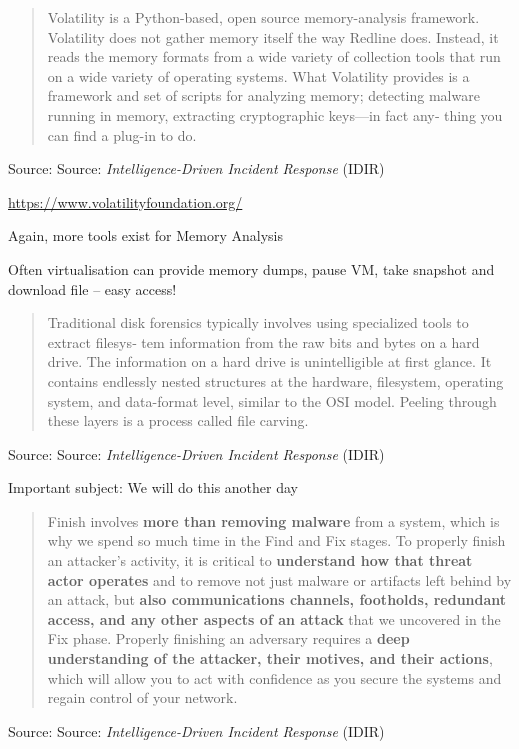 \documentclass[Screen16to9,17pt]{foils}
\begin{document}

\begin{quote}
Volatility is a Python-based, open source memory-analysis framework. Volatility does
not gather memory itself the way Redline does. Instead, it reads the memory formats
from a wide variety of collection tools that run on a wide variety of operating systems.
What Volatility provides is a framework and set of scripts for analyzing memory;
detecting malware running in memory, extracting cryptographic keys—in fact any‐
thing you can find a plug-in to do.
\end{quote}
Source: Source: \emph{Intelligence-Driven Incident Response} (IDIR)

\begin{list2}
\item \url{https://www.volatilityfoundation.org/}
\item Again, more tools exist for Memory Analysis
\item Often virtualisation can provide memory dumps, pause VM, take snapshot and download file -- easy access!
\end{list2}




\begin{quote}
Traditional disk forensics typically involves using specialized tools to extract filesys‐
tem information from the raw bits and bytes on a hard drive. The information on a
hard drive is unintelligible at first glance. It contains endlessly nested structures at the
hardware, filesystem, operating system, and data-format level, similar to the OSI
model. Peeling through these layers is a process called file carving.
\end{quote}
Source: Source: \emph{Intelligence-Driven Incident Response} (IDIR)

\begin{list2}
\item Important subject: We will do this another day
\end{list2}





\begin{quote}
Finish involves {\bf more than removing malware} from a system, which is why we spend
so much time in the Find and Fix stages. To properly finish an attacker’s activity, it is
critical to {\bf understand how that threat actor operates} and to remove not just malware
or artifacts left behind by an attack, but  {\bf also communications channels, footholds,
redundant access, and any other aspects of an attack} that we uncovered in the Fix
phase. Properly finishing an adversary requires a {\bf deep understanding of the attacker,
their motives, and their actions}, which will allow you to act with confidence as you
secure the systems and regain control of your network.
\end{quote}
Source: Source: \emph{Intelligence-Driven Incident Response} (IDIR)
\end{document}
